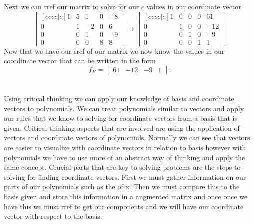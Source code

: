 \documentclass[12pt]{article}
\begin{document}
Next we can rref our matrix to solve for our $c$ values in our coordinate vector
\begin{equation*}
\begin{bmatrix}[cccc|c]
1 & 5 & 1 & 0 & -8\\
0 & 1 & -2 & 0 & 6\\
0 & 0 & 1 & 0 & -9\\
0 & 0 & 0 & 8 &8
\end{bmatrix}
\rightarrow
\begin{bmatrix}[cccc|c]
1 & 0 & 0 & 0 & 61\\
0 & 1 & 0 & 0 & -12\\
0 & 0 & 1 & 0 & -9\\
0 & 0 & 0 & 1 &1
\end{bmatrix}
\end{equation*}
Now that we have our rref of our matrix we now know the values in our coordinate vector that  can be written in the form
\begin{equation*}
f_B=\begin{bmatrix}
61 &
-12 &
-9 &
1
\end{bmatrix}.
\end{equation*}
 \\\\
Using critical thinking we can apply our knowledge of basis and coordinate vectors to polynomials. We can treat polynomials similar to vectors and apply our rules that we know to solving for coordinate vectors from a basis that is given. Critical thinking aspects that are involved are using the application of vectors and coordinate vectors of polynomials. Normally we can see that vectors are easier to visualize with coordinate vectors in relation to basis however with polynomials we have to use more of an abstract way of thinking and apply the same concept. Crucial parts that are key to solving problems are the steps to solving for finding coordinate vectors. First we must gather information on our parts of our polynomials such as the of x. Then we must compare this to the basis given and store this information in a augmented matrix and once once we have this we must rref to get our components and we will have our coordinate vector with respect to the basis. 
\pagebreak
\end{document}

